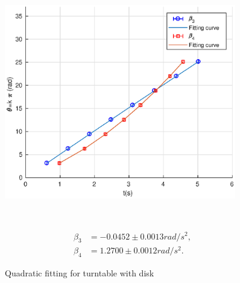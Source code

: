     \begin{figure}[H]
    \centering
    \begin{minipage}{0.6\textwidth}    
        \includegraphics[width=0.9\textwidth]{images/2}
        \caption{Quadratic fitting for turntable with disk}\label{fig_2}
    \end{minipage}
    ~
    \begin{minipage}{0.35\textwidth}
        \[
        \begin{split}
            \beta_3&=-0.0452\pm 0.0013rad/s^2,\\
            \beta_4&=1.2700\pm 0.0012rad/s^2.
        \end{split}
        \]
    \end{minipage}
    \end{figure}

